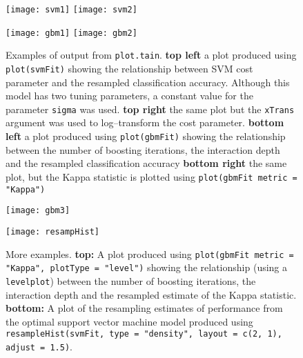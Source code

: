 \documentclass[12pt]{article}
\begin{document}
\begin{figure}[p]
   \begin{center}		
      \texttt{[image: svm1]}
      \hspace*{.4 in}   
      \texttt{[image: svm2]}
      
      \vspace*{.5 in}   
      
      \texttt{[image: gbm1]}
      \hspace*{.4 in}
      \texttt{[image: gbm2]}    

      \caption{ Examples of output from \texttt{plot.tain}. {\bf top left} a plot produced using \texttt{plot(svmFit)} showing the relationship between SVM cost parameter and the resampled classification accuracy. Although this model has two tuning parameters, a constant value for the parameter \texttt{sigma} was used. {\bf top right} the same plot but the \texttt{xTrans} argument was used to log--transform the cost parameter. {\bf bottom left} a plot produced using \texttt{plot(gbmFit)} showing the relationship between the number of boosting iterations, the interaction depth and the resampled classification accuracy {\bf bottom right} the same plot, but the Kappa statistic is plotted using \texttt{plot(gbmFit metric = "Kappa")}}
      \label{f:plots1} 
    \end{center}
\end{figure} 
	   
\begin{figure}[p]
   \begin{center}	
      \texttt{[image: gbm3]}    
   
      \vspace*{1 in}      
      
      \texttt{[image: resampHist]}
   
 \caption{More examples. {\bf top:} A plot produced using \texttt{plot(gbmFit metric = "Kappa", plotType = "level")} showing the relationship (using a \texttt{levelplot}) between the number of boosting iterations, the interaction depth and the resampled estimate of the Kappa statistic. {\bf bottom:} A plot of the resampling estimates of performance from the optimal support vector machine model produced using \texttt{resampleHist(svmFit, type = "density", layout = c(2, 1), adjust = 1.5)}.}   
      \label{f:plots2}         
   \end{center}
\end{figure}   
\end{document}
